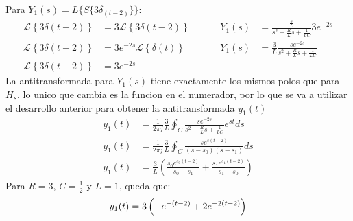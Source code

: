 \documentclass[12pt,a4paper]{report}
\begin{document}
\begin{enumerate}[label=\alph*)]
    Para $Y_1(s) = L\{S\{3\delta_{(t-2)}\}\}$:
    \begin{align*}
      \mathcal{L} \left\{3\delta (t-2)\right\} &= 3\mathcal{L}\left\{3\delta (t-2)\right\} \hspace{1cm} &Y_1(s) 
                                               &= \frac{\frac{s}{L}}{s^2 + \frac{R}{L} s + \frac{1}{LC}} 3e^{-2s}\\[6pt]
      \mathcal{L} \left\{3\delta (t-2)\right\} &= 3 e^{-2s}\mathcal{L}\left\{\delta (t)\right\} &Y_1(s) 
                                               &= \frac{3}{L}\frac{se^{-2s}}{s^2 + \frac{R}{L} s + \frac{1}{LC}}\\[6pt]
      \mathcal{L} \left\{3\delta (t-2)\right\} &= 3 e^{-2s}
    \end{align*}
    La antitransformada para $Y_1(s)$ tiene exactamente los mismos polos que para $H_s$, lo unico que cambia es la
    funcion en el numerador, por lo que se va a utilizar el desarrollo anterior para obtener la antitransformada $y_1(t)$
    \begin{align*}
      y_1(t) &= \frac{1}{2\pi j} \frac{3}{L} \oint_C \frac{se^{-2s}}{s^2 + \frac{R}{L} s + \frac{1}{LC}} e^{st} ds\\[6pt]
      y_1(t) &= \frac{1}{2\pi j} \frac{3}{L} \oint_C \frac{se^{s(t-2)}}{(s-s_0)(s-s_1)} ds\\[6pt]
      y_1(t) &= \frac{3}{L} \left(\frac{s_0 e^{s_0(t-2)}}{s_0 - s_1} + \frac{s_1 e^{s_1(t-2)}}{s_1 - s_0}\right)
    \end{align*}
    Para $R = 3$, $C = \frac{1}{2}$ y $L = 1$, queda que:
    \begin{equation*}
      y_1(t) = 3\left(-e^{-(t-2)} + 2e^{-2(t-2)}\right)\\[6pt]
    \end{equation*}


\end{enumerate}
\end{document}
